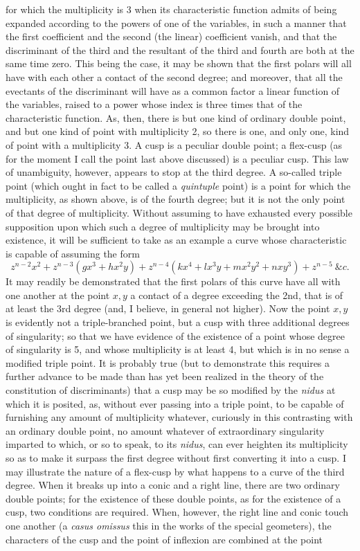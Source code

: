 \documentclass[11pt]{article}
\newcommand{\sourcepage}[1]{\marginpar{\scriptsize p.~#1}}
\begin{document}
{{\sourcepage{373}
for which the multiplicity is 3 when its characteristic function admits of being expanded according to the powers of one of the variables, in such a manner that the first coefficient and the second (the linear) coefficient vanish, and that the discriminant of the third and the resultant of the third and fourth are both at the same time zero. This being the case, it may be shown that the first polars will all have with each other a contact of the second degree; and moreover, that all the evectants of the discriminant will have as a common factor a linear function of the variables, raised to a power whose index is three times that of the characteristic function. As, then, there is but one kind of ordinary double point, and but one kind of point with multiplicity 2, so there is one, and only one, kind of point with a multiplicity 3. A cusp is a peculiar double point; a flex-cusp (as for the moment I call the point last above discussed) is a peculiar cusp. This law of unambiguity, however, appears to stop at the third degree. A so-called triple point (which ought in fact to be called a \emph{quintuple} point) is a point for which the multiplicity, as shown above, is of the fourth degree; but it is not the only point of that degree of multiplicity. Without assuming to have exhausted every possible supposition upon which such a degree of multiplicity may be brought into existence, it will be sufficient to take as an example a curve whose characteristic is capable of assuming the form
\[
z^{n-2}x^2+z^{n-3}(gx^3+hx^2y)+z^{n-4}(kx^4+lx^3y+mx^2y^2+nxy^3)+z^{n-5}\ \&c.
\]
It may readily be demonstrated that the first polars of this curve have all with one another at the point $x,y$ a contact of a degree exceeding the 2nd, that is of at least the 3rd degree (and, I believe, in general not higher). Now the point $x,y$ is evidently not a triple-branched point, but a cusp with three additional degrees of singularity; so that we have evidence of the existence of a point whose degree of singularity is 5, and whose multiplicity is at least 4, but which is in no sense a modified triple point. It is probably true (but to demonstrate this requires a further advance to be made than has yet been realized in the theory of the constitution of discriminants) that a cusp may be so modified by the \emph{nidus} at which it is posited, as, without ever passing into a triple point, to be capable of furnishing any amount of multiplicity whatever, curiously in this contrasting with an ordinary double point, no amount whatever of extraordinary singularity imparted to which, or so to speak, to its \emph{nidus}, can ever heighten its multiplicity so as to make it surpass the first degree without first converting it into a cusp. I may illustrate the nature of a flex-cusp by what happens to a curve of the third degree. When it breaks up into a conic and a right line, there are two ordinary double points; for the existence of these double points, as for the existence of a cusp, two conditions are required. When, however, the right line and conic touch one another (a \emph{casus omissus} this in the works of the special geometers), the characters of the cusp and the point of inflexion are combined at the point

}}
\end{document}
